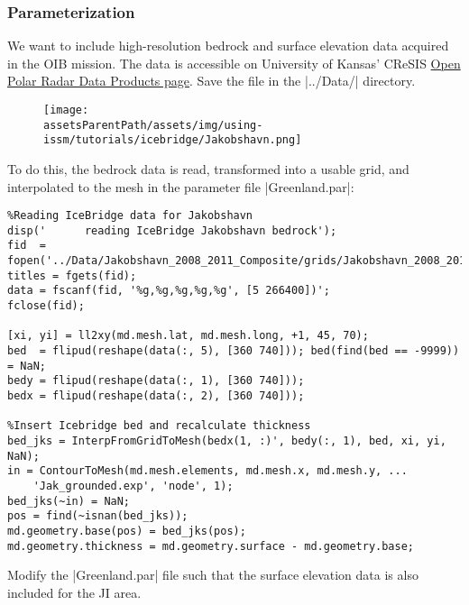 \subsubsection{Parameterization} %
We want to include high-resolution bedrock and surface elevation data acquired in the OIB mission. The data is accessible on University of Kansas' CReSIS \href{https://data.cresis.ku.edu/data/grids/old_versions/Jakobshavn_2008_2011_Composite.zip}{Open Polar Radar Data Products page}. Save the file in the \lstinlinebg|../Data/| directory.
\begin{figure}[H]
	\begin{center}
	\texttt{[image: \\assetsParentPath/assets/img/using-issm/tutorials/icebridge/Jakobshavn.png]}
\end{center}
\end{figure}
To do this, the bedrock data is read, transformed into a usable grid, and interpolated to the mesh in the parameter file \lstinlinebg|Greenland.par|:
\begin{lstlisting}
%Reading IceBridge data for Jakobshavn
disp('      reading IceBridge Jakobshavn bedrock');
fid  = fopen('../Data/Jakobshavn_2008_2011_Composite/grids/Jakobshavn_2008_2011_Composite_XYZGrid.txt');
titles = fgets(fid); 
data = fscanf(fid, '%g,%g,%g,%g,%g', [5 266400])';
fclose(fid);

[xi, yi] = ll2xy(md.mesh.lat, md.mesh.long, +1, 45, 70);
bed  = flipud(reshape(data(:, 5), [360 740])); bed(find(bed == -9999)) = NaN;
bedy = flipud(reshape(data(:, 1), [360 740]));
bedx = flipud(reshape(data(:, 2), [360 740]));

%Insert Icebridge bed and recalculate thickness
bed_jks = InterpFromGridToMesh(bedx(1, :)', bedy(:, 1), bed, xi, yi, NaN);
in = ContourToMesh(md.mesh.elements, md.mesh.x, md.mesh.y, ...
	'Jak_grounded.exp', 'node', 1);
bed_jks(~in) = NaN;
pos = find(~isnan(bed_jks));
md.geometry.base(pos) = bed_jks(pos);
md.geometry.thickness = md.geometry.surface - md.geometry.base;
\end{lstlisting}

Modify the \lstinlinebg|Greenland.par| file such that the surface elevation data is also included for the JI area.

